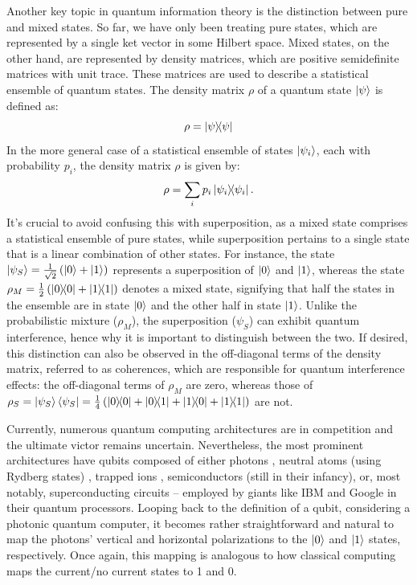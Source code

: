 Another key topic in quantum information theory is the distinction between pure and mixed states. So far, we have only been treating pure states, which are represented by a single ket vector in some Hilbert space. Mixed states, on the other hand, are represented by density matrices, which are positive semidefinite matrices with unit trace. These matrices are used to describe a statistical ensemble of quantum states. The density matrix $\rho$ of a quantum state $\ket{\psi}$ is defined as:
\begin{equation}
  \rho = \dyad{\psi}{\psi}
\end{equation}
In the more general case of a statistical ensemble of states $\ket{\psi_i}$, each with probability $p_i$, the density matrix $\rho$ is given by:
\begin{equation}
  \rho = \sum_i p_i \dyad{\psi_i}{\psi_i}.
\end{equation}
It's crucial to avoid confusing this with superposition, as a mixed state comprises a statistical ensemble of pure states, while superposition pertains to a single state that is a linear combination of other states. For instance, the state $\ket{\psi_S} = \frac{1}{\sqrt{2}}\left(\ket{0} + \ket{1}\right)$ represents a superposition of $\ket{0}$ and $\ket{1}$, whereas the state $\rho_M = \frac{1}{2}\left(\dyad{0}{0} + \dyad{1}{1}\right)$ denotes a mixed state, signifying that half the states in the ensemble are in state $\ket{0}$ and the other half in state $\ket{1}$. Unlike the probabilistic mixture ($\rho_M$), the superposition ($\psi_S$) can exhibit quantum interference, hence why it is important to distinguish between the two. If desired, this distinction can also be observed in the off-diagonal terms of the density matrix, referred to as coherences, which are responsible for quantum interference effects: the off-diagonal terms of $\rho_{M}$ are zero, whereas those of $\rho_{S} = \ket{\psi_S}\bra{\psi_S} = \frac{1}{4}\left(\dyad{0}{0} + \dyad{0}{1} + \dyad{1}{0} + \dyad{1}{1}\right)$ are not.

Currently, numerous quantum computing architectures are in competition and the ultimate victor remains uncertain. Nevertheless, the most prominent architectures have qubits composed of either photons \cite{slussarenko2019photonic, Xanadu_Photonics}, neutral atoms (using Rydberg states) \cite{Henriet2020quantumcomputing, Wu_2021}, trapped ions \cite{bruzewicz2019trapped}, semiconductors (still in their infancy), or, most notably, superconducting circuits \cite{Huang_2020, SC_Qubits} – employed by giants like IBM and Google in their quantum processors. Looping back to the definition of a qubit, considering a photonic quantum computer, it becomes rather straightforward and natural to map the photons' vertical and horizontal polarizations to the $\ket{0}$ and $\ket{1}$ states, respectively. Once again, this mapping is analogous to how classical computing maps the current/no current states to 1 and 0.


